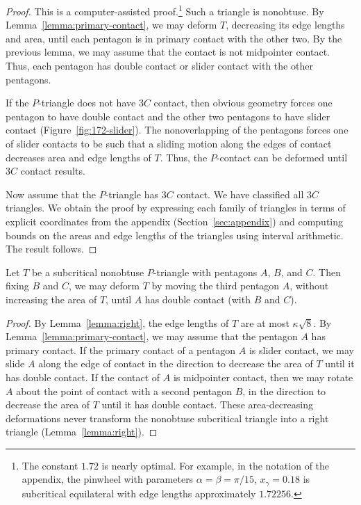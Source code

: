 \begin{proof} This is a computer-assisted proof.\footnote{The constant
    $1.72$ is nearly optimal.  For example, in the notation of the
    appendix, the pinwheel with parameters $\alpha=\beta=\pi/15$,
    $x_\gamma = 0.18$ is subcritical equilateral with edge lengths
    approximately $1.72256$.} Such a triangle is nonobtuse.  By
  Lemma~\ref{lemma:primary-contact}, we may deform $T$, decreasing its
  edge lengths and area, until each pentagon is in primary contact
  with the other two.  By the previous lemma, we may assume that the
  contact is not midpointer contact.  Thus, each pentagon has double
  contact or slider contact with the other pentagons.

  If the $P$-triangle does not have $3C$ contact, then obvious
  geometry forces one pentagon to have double contact and the other
  two pentagons to have slider contact (Figure~\ref{fig:172-slider}).
  The nonoverlapping of the pentagons forces one of slider contacts to
  be such that a sliding motion along the edges of contact decreases
  area and edge lengths of $T$.  Thus, the $P$-contact can be deformed
  until $3C$ contact results.



Now assume that the $P$-triangle has $3C$ contact.
We have classified all $3C$ triangles.  We obtain the proof
by expressing each family of triangles in terms of explicit
coordinates from the appendix (Section~\ref{sec:appendix}) and
computing bounds on the areas and edge lengths of the triangles using
interval arithmetic.  The result follows.
\end{proof}

\begin{lemma}\label{lemma:2C} 
  Let $T$ be a subcritical nonobtuse $P$-triangle with pentagons $A$,
  $B$, and $C$.  Then fixing $B$ and $C$, we may deform $T$ by moving
  the third pentagon $A$, without increasing the area of $T$, until
  $A$ has double contact (with $B$ and $C$).
\end{lemma}

\begin{proof}
  By Lemma~\ref{lemma:right}, the edge lengths of $T$ are at most
  $\kappa\sqrt8$.  By Lemma~\ref{lemma:primary-contact}, we may assume
  that the pentagon $A$ has primary contact.  If the primary contact
  of a pentagon $A$ is slider contact, we may slide $A$ along the edge
  of contact in the direction to decrease the area of $T$ until it has
  double contact.  If the contact of $A$ is midpointer contact, then
  we may rotate $A$ about the point of contact with a second pentagon
  $B$, in the direction to decrease the area of $T$ until it has
  double contact.  These area-decreasing deformations never transform
  the nonobtuse subcritical triangle into a right triangle
  (Lemma~\ref{lemma:right}).
\end{proof}


